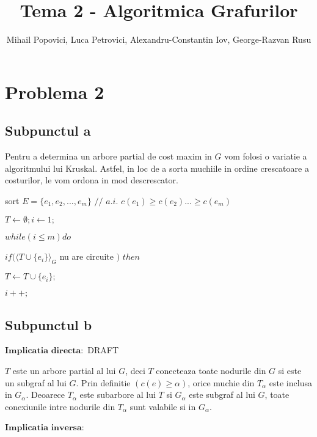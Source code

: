 \documentclass{article}
\title{Tema 2 - Algoritmica Grafurilor}
\author{Mihail Popovici, Luca Petrovici, Alexandru-Constantin Iov, George-Razvan Rusu}
\begin{document}
\maketitle

\section*{\fontsize{20}{50}\selectfont Problema 2}
\subsection*{\fontsize{16}{30}\selectfont Subpunctul a}
{\fontsize{14}{16}\selectfont 
    Pentru a determina un arbore partial de cost maxim in $G$ vom folosi o variatie a algoritmului lui Kruskal. Astfel, in loc de a sorta muchiile in ordine crescatoare a costurilor, le vom ordona in mod descrescator.
    \\ 
    \par sort $E=\lbrace e_1, e_2, ..., e_m \rbrace$ $//$ $a.i.$  $c(e_1)\geq c(e_2)...\geq c(e_m)$

    \par $T \leftarrow \emptyset; i \leftarrow 1;$
    \par $while(i \leq m) do$
    \par \hspace*{1cm} $if(\langle T \cup \lbrace e_i \rbrace \rangle _G$ nu are circuite $)$  $then$
    \par \hspace*{1.5cm} $ T \leftarrow T \cup \lbrace e_i \rbrace ;$
    \par \hspace*{1cm} $i++;$
    }

\subsection*{\fontsize{16}{30}\selectfont Subpunctul b}
{\fontsize{14}{16}\selectfont 
$\mathbf{Implicatia}$ $\mathbf{directa:}$ DRAFT
\\
\par $T$ este un arbore partial al lui $G$, deci $T$ conecteaza toate nodurile din $G$ si este un subgraf al lui $G$. Prin definitie $(c(e)\geq \alpha)$, orice muchie din $T_\alpha$ este inclusa in $G_\alpha$. Deoarece $T_\alpha$ este subarbore al lui $T$ si $G_\alpha$ este subgraf al lui $G$, toate conexiunile intre nodurile din $T_\alpha$ sunt valabile si in $G_\alpha$.         
\\
\par $\mathbf{Implicatia}$ $\mathbf{inversa:}$
\\
}    
\end{document}
